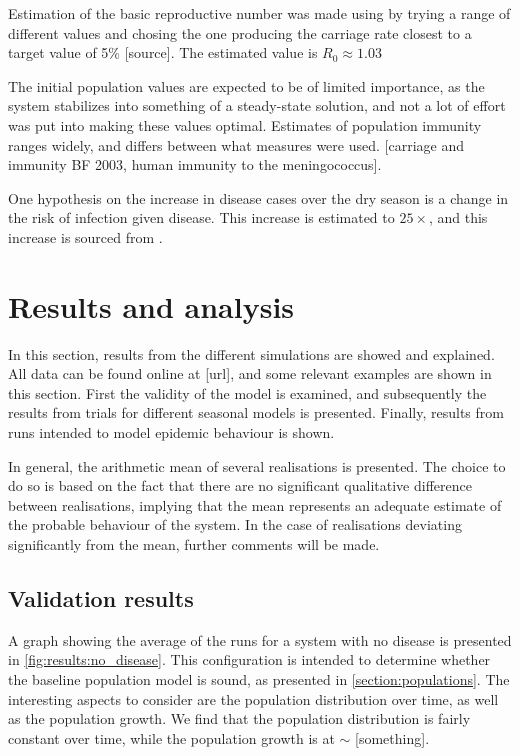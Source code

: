 \documentclass[10pt,a4paper]{article}
\begin{document}
Estimation of the basic reproductive number was made using by trying a range of different values and chosing the one producing the carriage rate closest to a target value of 5\% [source]. The estimated value is $R_0 \approx 1.03$

The initial population values are expected to be of limited importance, as the system stabilizes into something of a steady-state solution, and not a lot of effort was put into making these values optimal. Estimates of population immunity ranges widely, and differs between what measures were used. [carriage and immunity BF 2003, human immunity to the meningococcus].

One hypothesis on the increase in disease cases over the dry season is a change in the risk of infection given disease. This increase is estimated to $25\times$, and this increase is sourced from \cite{mueller2010hypothetical}.


\section{Results and analysis}

In this section, results from the different simulations are showed and explained. All data can be found online at [url], and some relevant examples are shown in this section. First the validity of the model is examined, and subsequently the results from trials for different seasonal models is presented. Finally, results from runs intended to model epidemic behaviour is shown.

In general, the arithmetic mean of several realisations is presented. The choice to do so is based on the fact that there are no significant qualitative difference between realisations, implying that the mean represents an adequate estimate of the probable behaviour of the system. In the case of realisations deviating significantly from the mean, further comments will be made.

\subsection{Validation results}

A graph showing the average of the runs for a system with no disease is presented in \cref{fig:results:no_disease}. This configuration is intended to determine whether the baseline population model is sound, as presented in \cref{section:populations}. The interesting aspects to consider are the population distribution over time, as well as the population growth. We find that the population distribution is fairly constant over time, while the population growth is at $\sim$ [something].
\end{document}
